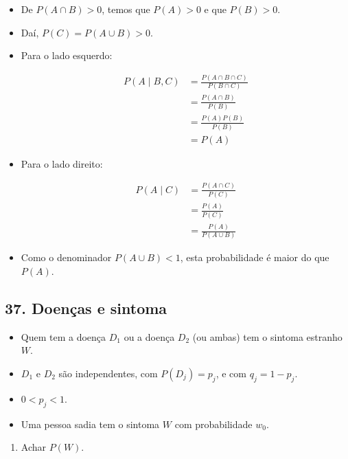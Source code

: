 \documentclass[
  11pt]{report}
\providecommand{\tightlist}{%
  \setlength{\itemsep}{0pt}\setlength{\parskip}{0pt}}
\begin{document}
\begin{itemize}
\item
  De $P(A \cap B) > 0$, temos que $P(A) > 0$ e que $P(B) > 0$.
\item
  Daí, $P(C) = P(A \cup B) > 0$.
\item
  Para o lado esquerdo:

  \[
  \begin{aligned}
  P(A \mid B, C) 
  &= \frac{P(A \cap B \cap C)}{P(B \cap C)} \\
  &= \frac{P(A \cap B)}{P(B)} \\
  &= \frac{P(A)P(B)}{P(B)} \\
  &= P(A)
  \end{aligned}
  \]
\item
  Para o lado direito:

  \[
  \begin{aligned}
  P(A \mid C) 
  &= \frac{P(A \cap C)}{P(C)} \\
  &= \frac{P(A)}{P(C)} \\
  &= \frac{P(A)}{P(A \cup B)} 
  \end{aligned}
  \]
\item
  Como o denominador $P(A \cup B) < 1$, esta probabilidade é maior do que $P(A)$.
\end{itemize}

\hypertarget{doenuxe7as-e-sintoma}{%
\subsection*{37. Doenças e sintoma}\label{doenuxe7as-e-sintoma}}

\begin{rmdbox}

\begin{itemize}
\item
  Quem tem a doença $D_1$ ou a doença $D_2$ (ou ambas) tem o sintoma estranho $W$.
\item
  $D_1$ e $D_2$ são independentes, com $P(D_j) = p_j$, e com $q_j = 1 - p_j$.
\item
  $0 < p_j < 1$.
\item
  Uma pessoa sadia tem o sintoma $W$ com probabilidade $w_0$.
\end{itemize}

\end{rmdbox}

\begin{rmdbox}

\begin{enumerate}
\def\labelenumi{\alph{enumi}.}
\tightlist
\item
  Achar $P(W)$.
\end{enumerate}

\end{rmdbox}
\end{document}
